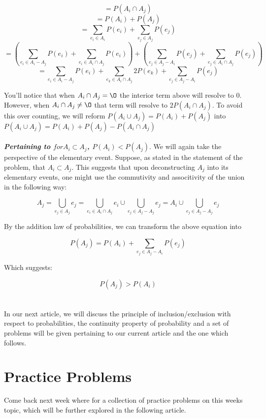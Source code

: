 \documentclass{article}
\begin{document}
\[= P(A_i \cap A_j)\]
\[= P(A_i) + P(A_j)\]
\[= \sum_{e_i \in A_i}P(e_i) + \sum_{e_j \in A_j}P(e_j)\]
\[= (\sum_{e_i \in A_i - A_j}P(e_i) + \sum
_{e_i \in A_i \cap A_j}P(e_i)) + (\sum_{e_j \in A_j - A_i}P(e_j) + \sum_{e_j \in A_i \cap A_j}P(e_j))\]
\[= \sum_{e_i \in A_i - A_j}P(e_i) + \sum_{e_k \in A_i \cap A_j}2P(e_k) + \sum_{e_j \in A_j - A_i}P(e_j)\]

You'll notice that when \(A_i \cap A_j = \O\) the interior term above will resolve to 0. However, when \(A_i \cap A_j \neq \O\) that term will resolve to \(2P(A_i \cap A_j)\). To avoid this over counting, we will reform \(P(A_i \cup A_j) = P(A_i) + P(A_j)\) into \(P(A_i \cup A_j) = P(A_i) + P(A_j) - P(A_i \cap A_j)\)
\\
\\
\textbf{\textit{Pertaining to \(for  A_i \subset A_j\), \(P(A_i) < P(A_j)\)}}. We will again take the perspective of the elementary event. Suppose, as stated in the statement of the problem, that \(A_i \subset A_j\). This suggests that upon deconstructing \(A_j\) into its elementary events, one might use the commutivity and associtivity of the union in the following way:

\[A_j = \bigcup_{e_j \in A_j}e_j = \bigcup_{e_i \in A_i \cap A_j}e_i \cup \bigcup_{e_j \in A_j - A_j}e_j = A_i \cup \bigcup_{e_j \in A_j - A_j}e_j\]

By the addition law of probabilities, we can transform the above equation into

\[P(A_j) = P(A_i) + \sum_{e_j \in A_j-A_i}P(e_j)\]

Which suggests:

\[P(A_j) > P(A_i)\]
\\
\\
In our next article, we will discuss the principle of inclusion/exclusion with respect to probabilities, the continuity property of probability and a set of problems will be given pertaining to our current article and the one which follows.

\section{Practice Problems}
Come back next week where for a collection of practice problems on this weeks topic, which will be further explored in the following article.
\end{document}
